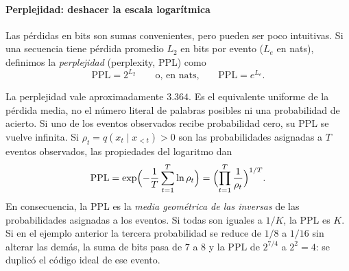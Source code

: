\paragraph{Perplejidad: deshacer la escala logarítmica}
Las pérdidas en bits son sumas convenientes, pero pueden ser poco intuitivas. Si una secuencia tiene pérdida promedio $L_2$ en bits por evento ($L_e$ en nats), definimos la \emph{perplejidad} (perplexity, PPL) como
\[
\boxed{\mathrm{PPL}=2^{L_2}}\qquad \text{o, en nats,}\qquad \boxed{\mathrm{PPL}=e^{L_e}}.
\]
\begin{center}
\end{center}
La perplejidad vale aproximadamente $3.364$. Es el equivalente uniforme de la pérdida media, no el número literal de palabras posibles ni una probabilidad de acierto. Si uno de los eventos observados recibe probabilidad cero, su PPL se vuelve infinita.
Si $\rho_t=q(x_t\mid x_{<t})>0$ son las probabilidades asignadas a $T$ eventos
observados, las propiedades del logaritmo dan
\[
\operatorname{PPL}
=\exp\Bigl(-\frac1T\sum_{t=1}^T\ln\rho_t\Bigr)
=\Bigl(\prod_{t=1}^T\frac1{\rho_t}\Bigr)^{1/T}.
\]
En consecuencia, la PPL es la \emph{media geométrica de las inversas}
de las probabilidades asignadas a los eventos. Si todas son iguales a
$1/K$, la PPL es $K$. Si en el ejemplo anterior la tercera probabilidad se reduce
de $1/8$ a $1/16$ sin alterar las demás, la suma de bits pasa de $7$ a $8$ y la
PPL de $2^{7/4}$ a $2^2=4$: se duplicó el código ideal de ese evento.

